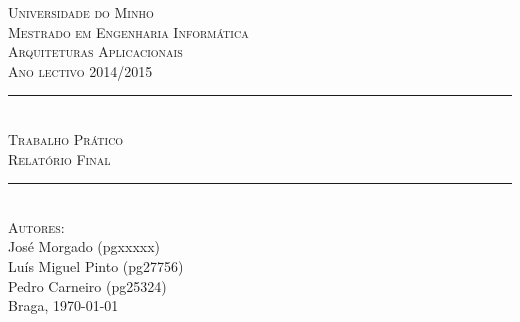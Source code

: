 \begin{titlepage}
\onehalfspacing

\newcommand{\HRule}{\rule{\linewidth}{0.5mm}} %

\center %


\textsc{\LARGE Universidade do Minho}\\[1.5cm] %
\textsc{\Large Mestrado em Engenharia Informática}\\[0.5cm] %
\textsc{\large Arquiteturas Aplicacionais}\\[0.5cm] %
\textsc{Ano lectivo 2014/2015}\\[0.5cm]


\HRule \\[0.4cm]
\textsc{\Large Trabalho Prático}\\[0.4cm] %
\textsc{ \large Relatório Final}\\[0.4cm] %
\HRule \\[1.5cm]


\textsc{\large Autores:}\\
{
José Morgado (pgxxxxx) \\
Luís Miguel Pinto (pg27756) \\
Pedro Carneiro (pg25324)
}\\[1cm] %


Braga, {\large \today}\\[1cm] %


\end{titlepage}
